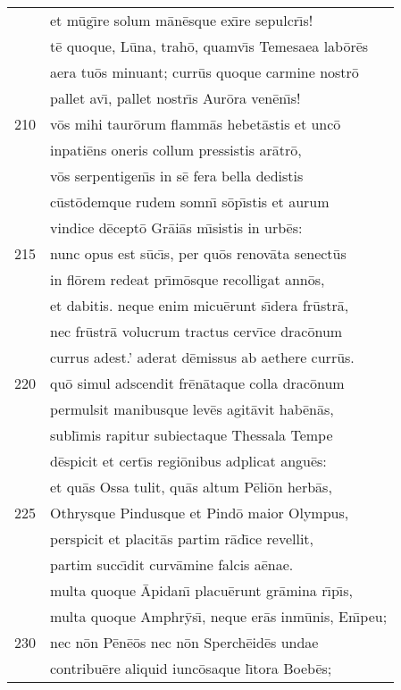 \documentclass[paper=6in:9in,pagesize=pdftex,
               headinclude=on,footinclude=on,12pt]{scrbook}
\begin{document}
\begin{longtable}[p]{ r l }
 & et m\=ug\={\i}re solum m\=an\=esque ex\={\i}re sepulcr\={\i}s!\\ 
 & t\=e quoque, L\=una, trah\=o, quamv\={\i}s Temesaea lab\=or\=es\\ 
 & aera tu\=os minuant; curr\=us quoque carmine nostr\=o\\ 
 & pallet av\={\i}, pallet nostr\={\i}s Aur\=ora ven\=en\={\i}s!\\ 
210 & v\=os mihi taur\=orum flamm\=as hebet\=astis et unc\=o\\ 
 & inpati\=ens oneris collum pressistis ar\=atr\=o,\\ 
 & v\=os serpentigen\={\i}s in s\=e fera bella dedistis\\ 
 & c\=ust\=odemque rudem somn\={\i} s\=op\={\i}stis et aurum\\ 
 & vindice d\=ecept\=o Gr\=ai\=as m\={\i}sistis in urb\=es:\\ 
215 & nunc opus est s\=uc\={\i}s, per qu\=os renov\=ata senect\=us\\ 
 & in fl\=orem redeat pr\={\i}m\=osque recolligat ann\=os,\\ 
 & et dabitis. neque enim micu\=erunt s\={\i}dera fr\=ustr\=a,\\ 
 & nec fr\=ustr\=a volucrum tractus cerv\={\i}ce drac\=onum\\ 
 & currus adest.' aderat d\=emissus ab aethere curr\=us.\\ 
220 & qu\=o simul adscendit fr\=en\=ataque colla drac\=onum\\ 
 & permulsit manibusque lev\=es agit\=avit hab\=en\=as,\\ 
 & subl\={\i}mis rapitur subiectaque Thessala Tempe\\ 
 & d\=espicit et cert\={\i}s regi\=onibus adplicat angu\=es:\\ 
 & et qu\=as Ossa tulit, qu\=as altum P\=eli\=on herb\=as,\\ 
225 & Othrysque Pindusque et Pind\=o maior Olympus,\\ 
 & perspicit et placit\=as partim r\=ad\={\i}ce revellit,\\ 
 & partim succ\={\i}dit curv\=amine falcis a\=enae.\\ 
 & multa quoque \=Apidan\={\i} placu\=erunt gr\=amina r\={\i}p\={\i}s,\\ 
 & multa quoque Amphr\=ys\={\i}, neque er\=as inm\=unis, En\={\i}peu;\\ 
230 & nec n\=on P\=en\=e\=os nec n\=on Sperch\=eid\=es undae\\ 
 & contribu\=ere aliquid iunc\=osaque l\={\i}tora Boeb\=es;\\ 

\end{longtable}
\end{document}
